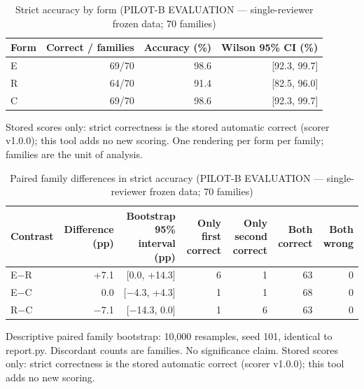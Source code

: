 \begin{table}[t]
\centering
\small
\caption{Strict accuracy by form (PILOT-B EVALUATION --- single-reviewer frozen data; 70 families)}
\label{tab:pilotb-Qwen3-8B-accuracy}
\begin{tabular}{lrrr}
\toprule
Form & Correct / families & Accuracy (\%) & Wilson 95\% CI (\%) \\
\midrule
E & 69/70 & 98.6 & [92.3, 99.7] \\
R & 64/70 & 91.4 & [82.5, 96.0] \\
C & 69/70 & 98.6 & [92.3, 99.7] \\
\bottomrule
\end{tabular}
\par\smallskip
\parbox{\linewidth}{\footnotesize Stored scores only: strict correctness is the stored automatic correct (scorer v1.0.0); this tool adds no new scoring. One rendering per form per family; families are the unit of analysis.}
\end{table}

\begin{table}[t]
\centering
\small
\caption{Paired family differences in strict accuracy (PILOT-B EVALUATION --- single-reviewer frozen data; 70 families)}
\label{tab:pilotb-Qwen3-8B-paired}
\begin{tabular}{lrrrrrr}
\toprule
Contrast & Difference (pp) & Bootstrap 95\% interval (pp) & Only first correct & Only second correct & Both correct & Both wrong \\
\midrule
E$-$R & +7.1 & [0.0, +14.3] & 6 & 1 & 63 & 0 \\
E$-$C & 0.0 & [$-$4.3, +4.3] & 1 & 1 & 68 & 0 \\
R$-$C & $-$7.1 & [$-$14.3, 0.0] & 1 & 6 & 63 & 0 \\
\bottomrule
\end{tabular}
\par\smallskip
\parbox{\linewidth}{\footnotesize Descriptive paired family bootstrap: 10,000 resamples, seed 101, identical to report.py. Discordant counts are families. No significance claim. Stored scores only: strict correctness is the stored automatic correct (scorer v1.0.0); this tool adds no new scoring.}
\end{table}

